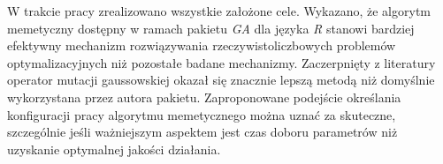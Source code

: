 \par
W trakcie pracy zrealizowano wszystkie założone cele. Wykazano, że algorytm memetyczny dostępny w ramach pakietu \emph{GA} dla języka \emph{R} stanowi bardziej efektywny mechanizm rozwiązywania rzeczywistoliczbowych problemów optymalizacyjnych niż pozostałe badane mechanizmy. Zaczerpnięty z literatury operator mutacji gaussowskiej okazał się znacznie lepszą metodą niż domyślnie wykorzystana przez autora pakietu. Zaproponowane podejście określania konfiguracji pracy algorytmu memetycznego można uznać za skuteczne, szczególnie jeśli ważniejszym aspektem jest czas doboru parametrów niż uzyskanie optymalnej jakości działania.



